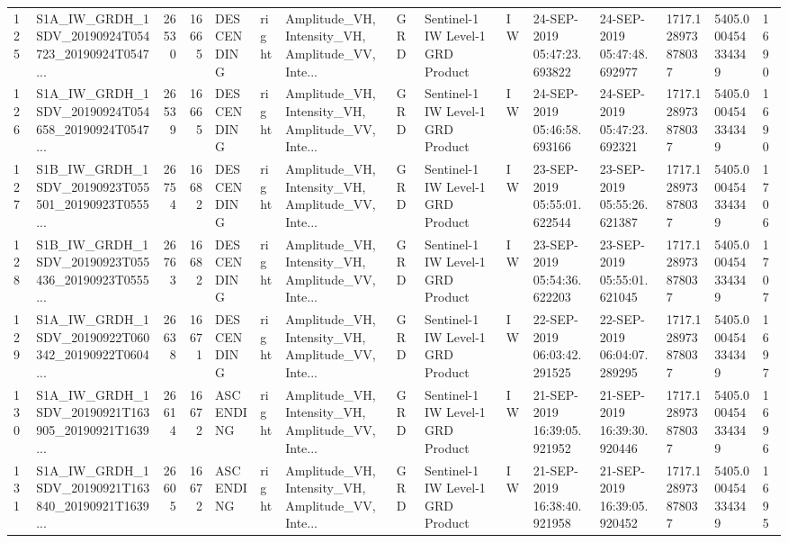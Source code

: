\begin{tabular}{llrrlllllllllll}
125 &  S1A\_IW\_GRDH\_1SDV\_20190924T054723\_20190924T0547... &  26530 &   16665 &  DESCENDING &  right &  Amplitude\_VH, Intensity\_VH, Amplitude\_VV, Inte... &          GRD &  Sentinel-1 IW Level-1 GRD Product &              IW &  24-SEP-2019 05:47:23.693822 &  24-SEP-2019 05:47:48.692977 &          1717.128973878037 &  5405.000454334349 &       1690 \\
126 &  S1A\_IW\_GRDH\_1SDV\_20190924T054658\_20190924T0547... &  26539 &   16665 &  DESCENDING &  right &  Amplitude\_VH, Intensity\_VH, Amplitude\_VV, Inte... &          GRD &  Sentinel-1 IW Level-1 GRD Product &              IW &  24-SEP-2019 05:46:58.693166 &  24-SEP-2019 05:47:23.692321 &          1717.128973878037 &  5405.000454334349 &       1690 \\
127 &  S1B\_IW\_GRDH\_1SDV\_20190923T055501\_20190923T0555... &  26754 &   16682 &  DESCENDING &  right &  Amplitude\_VH, Intensity\_VH, Amplitude\_VV, Inte... &          GRD &  Sentinel-1 IW Level-1 GRD Product &              IW &  23-SEP-2019 05:55:01.622544 &  23-SEP-2019 05:55:26.621387 &          1717.128973878037 &  5405.000454334349 &       1706 \\
128 &  S1B\_IW\_GRDH\_1SDV\_20190923T055436\_20190923T0555... &  26763 &   16682 &  DESCENDING &  right &  Amplitude\_VH, Intensity\_VH, Amplitude\_VV, Inte... &          GRD &  Sentinel-1 IW Level-1 GRD Product &              IW &  23-SEP-2019 05:54:36.622203 &  23-SEP-2019 05:55:01.621045 &          1717.128973878037 &  5405.000454334349 &       1707 \\
129 &  S1A\_IW\_GRDH\_1SDV\_20190922T060342\_20190922T0604... &  26638 &   16671 &  DESCENDING &  right &  Amplitude\_VH, Intensity\_VH, Amplitude\_VV, Inte... &          GRD &  Sentinel-1 IW Level-1 GRD Product &              IW &  22-SEP-2019 06:03:42.291525 &  22-SEP-2019 06:04:07.289295 &          1717.128973878037 &  5405.000454334349 &       1697 \\
130 &  S1A\_IW\_GRDH\_1SDV\_20190921T163905\_20190921T1639... &  26614 &   16672 &   ASCENDING &  right &  Amplitude\_VH, Intensity\_VH, Amplitude\_VV, Inte... &          GRD &  Sentinel-1 IW Level-1 GRD Product &              IW &  21-SEP-2019 16:39:05.921952 &  21-SEP-2019 16:39:30.920446 &          1717.128973878037 &  5405.000454334349 &       1696 \\
131 &  S1A\_IW\_GRDH\_1SDV\_20190921T163840\_20190921T1639... &  26605 &   16672 &   ASCENDING &  right &  Amplitude\_VH, Intensity\_VH, Amplitude\_VV, Inte... &          GRD &  Sentinel-1 IW Level-1 GRD Product &              IW &  21-SEP-2019 16:38:40.921958 &  21-SEP-2019 16:39:05.920452 &          1717.128973878037 &  5405.000454334349 &       1695 \\

\end{tabular}
